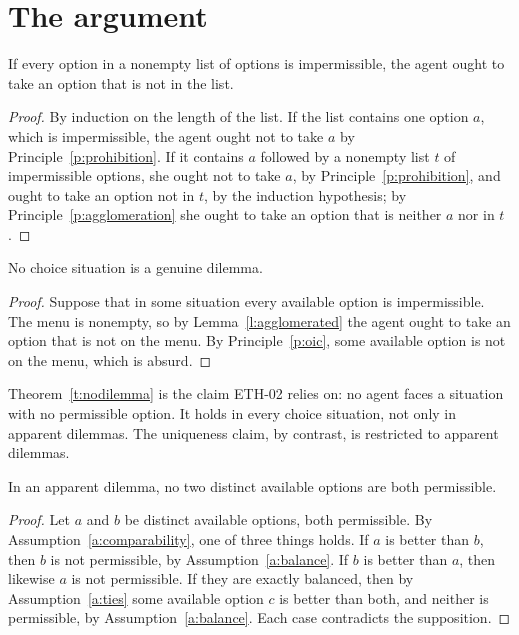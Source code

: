 \documentclass{situationist-preprint}
\begin{document}
\section{The argument}\label{s:argument}

\begin{lemma}\label{l:agglomerated}
If every option in a nonempty list of options is impermissible, the agent ought to take an option that is not in the list.
\end{lemma}

\begin{proof}
By induction on the length of the list. If the list contains one option $a$, which is impermissible, the agent ought not to take $a$ by Principle~\ref{p:prohibition}. If it contains $a$ followed by a nonempty list $t$ of impermissible options, she ought not to take $a$, by Principle~\ref{p:prohibition}, and ought to take an option not in $t$, by the induction hypothesis; by Principle~\ref{p:agglomeration} she ought to take an option that is neither $a$ nor in $t$.
\end{proof}

\begin{theorem}\label{t:nodilemma}
No choice situation is a genuine dilemma.
\end{theorem}

\begin{proof}
Suppose that in some situation every available option is impermissible. The menu is nonempty, so by Lemma~\ref{l:agglomerated} the agent ought to take an option that is not on the menu. By Principle~\ref{p:oic}, some available option is not on the menu, which is absurd.
\end{proof}

Theorem~\ref{t:nodilemma} is the claim ETH-02 relies on: no agent faces a situation with no permissible option. It holds in every choice situation, not only in apparent dilemmas. The uniqueness claim, by contrast, is restricted to apparent dilemmas.

\begin{theorem}[Uniqueness]\label{t:unique}
In an apparent dilemma, no two distinct available options are both permissible.
\end{theorem}

\begin{proof}
Let $a$ and $b$ be distinct available options, both permissible. By Assumption~\ref{a:comparability}, one of three things holds. If $a$ is better than $b$, then $b$ is not permissible, by Assumption~\ref{a:balance}. If $b$ is better than $a$, then likewise $a$ is not permissible. If they are exactly balanced, then by Assumption~\ref{a:ties} some available option $c$ is better than both, and neither is permissible, by Assumption~\ref{a:balance}. Each case contradicts the supposition.
\end{proof}
\end{document}
